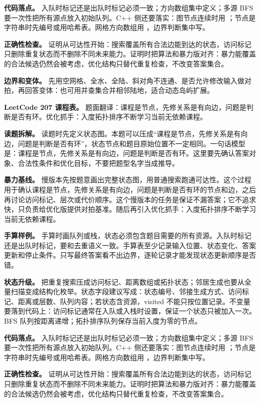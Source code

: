 \textbf{代码落点。} 入队时标记还是出队时标记必须一致；方向数组集中定义；多源 BFS 要一次性把所有源点放入初始队列。C++ 侧还要落实：图节点连续时用 ；节点是字符串时先编号或用哈希表。网格方向数组用 ，边界判断集中写。

\textbf{正确性检查。} 证明从可达性开始：搜索覆盖所有合法边能到达的状态，访问标记只删除重复状态而不删除不同未来能力。证明时把算法和暴力版对齐：暴力能覆盖的合法候选仍然会被考虑，优化结构只替代重复检查，不改变答案集合。

\textbf{边界和变体。} 先用空网格、全水、全陆、斜对角不连通、是否允许修改输入做对拍，再回答变体：也可用并查集合并相邻陆地，适合动态岛屿扩展。

\noindent\textbf{LeetCode 207 课程表。} 题面翻译：课程是节点，先修关系是有向边，问题是判断是否有环。优化抓手：入度拓扑排序不断学习当前无依赖课程。

\textbf{读题拆解。} 读题时先定义状态图。本题可以压成“课程是节点，先修关系是有向边，问题是判断是否有环”，状态节点和题目原始位置不一定相同。一句话模型是：课程是节点，先修关系是有向边，问题是判断是否有环。这里要先确认答案对象、合法性条件和优化目标，不要把题型名字当成推导。

\textbf{暴力基线。} 慢版本先按题意画出完整状态图，用普通搜索跑通可达性。这个过程用于确认课程是节点，先修关系是有向边，问题是判断是否有环的节点和边，之后再讨论访问标记、层次或代价顺序。这个慢版本的任务是保证不漏答案；它不追求快，只负责给优化版提供对拍基准。随后再引入优化抓手：入度拓扑排序不断学习当前无依赖课程。

\textbf{手算样例。} 手算时画队列或栈，状态必须包含题目需要的所有资源。入队时标记还是出队时标记，要和去重语义一致。手算表至少记录输入位置、状态变化、答案更新和停止条件。只写最终答案看不出边界，逐轮记录才能发现状态更新顺序是否错。

\textbf{状态升级。} 把重复搜索压成访问标记、距离数组或拓扑状态；邻居生成也要从全量扫描变成结构化枚举。状态字段建议写成：状态编号、邻接生成方式、访问标记、距离或层数、队列内容；若状态含资源，visited 不能只按位置记录。不变量要落到代码上：访问标记通常在入队或入栈时设置，保证一个状态只被加入一次。BFS 队列按距离递增；拓扑排序队列保存当前入度为零的节点。

\textbf{代码落点。} 入队时标记还是出队时标记必须一致；方向数组集中定义；多源 BFS 要一次性把所有源点放入初始队列。C++ 侧还要落实：图节点连续时用 ；节点是字符串时先编号或用哈希表。网格方向数组用 ，边界判断集中写。

\textbf{正确性检查。} 证明从可达性开始：搜索覆盖所有合法边能到达的状态，访问标记只删除重复状态而不删除不同未来能力。证明时把算法和暴力版对齐：暴力能覆盖的合法候选仍然会被考虑，优化结构只替代重复检查，不改变答案集合。

